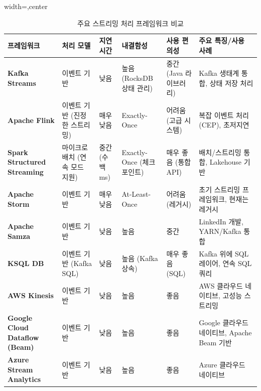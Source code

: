 \documentclass[11pt,a4paper]{article}
\begin{document}
\begin{table}[htbp]
\centering
\caption{주요 스트리밍 처리 프레임워크 비교}
\label{tab:streaming_frameworks}
\begin{adjustbox}{width=\textwidth,center}
\begin{tabular}{llllll}
\toprule
\textbf{프레임워크} & \textbf{처리 모델} & \textbf{지연 시간} & \textbf{내결함성} & \textbf{사용 편의성} & \textbf{주요 특징/사용 사례} \\
\midrule
\textbf{Kafka Streams} & 이벤트 기반 & 낮음 & 높음 (RocksDB 상태 관리) & 중간 (Java 라이브러리) & Kafka 생태계 통합, 상태 저장 처리 \\
\textbf{Apache Flink} & 이벤트 기반 (진정한 스트리밍) & 매우 낮음 & Exactly-Once & 어려움 (고급 시스템) & 복잡 이벤트 처리 (CEP), 초저지연 \\
\textbf{Spark Structured Streaming} & 마이크로 배치 (연속 모드 지원) & 중간 (수백 ms) & Exactly-Once (체크포인트) & 매우 좋음 (통합 API) & 배치/스트리밍 통합, Lakehouse 기반 \\
\textbf{Apache Storm} & 이벤트 기반 & 매우 낮음 & At-Least-Once & 어려움 (레거시) & 초기 스트리밍 프레임워크, 현재는 레거시 \\
\textbf{Apache Samza} & 이벤트 기반 & 낮음 & 높음 & 중간 & LinkedIn 개발, YARN/Kafka 통합 \\
\textbf{KSQL DB} & 이벤트 기반 (Kafka SQL) & 낮음 & 높음 (Kafka 상속) & 매우 좋음 (SQL) & Kafka 위에 SQL 레이어, 연속 SQL 쿼리 \\
\textbf{AWS Kinesis} & 이벤트 기반 & 낮음 & 높음 & 좋음 & AWS 클라우드 네이티브, 고성능 스트리밍 \\
\textbf{Google Cloud Dataflow (Beam)} & 이벤트 기반 & 낮음 & 높음 & 좋음 & Google 클라우드 네이티브, Apache Beam 기반 \\
\textbf{Azure Stream Analytics} & 이벤트 기반 & 낮음 & 높음 & 좋음 & Azure 클라우드 네이티브 \\
\bottomrule
\end{tabular}
\end{adjustbox}
\end{table}
\end{document}
